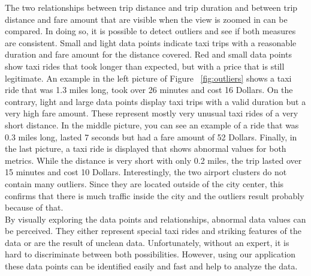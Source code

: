 \documentclass[sigconf, authorversion, nonacm=true]{acmart}
\begin{document}
The two relationships between trip distance and trip duration and between trip distance and fare amount that are visible when the view is zoomed in can be compared. In doing so, it is possible to detect outliers and see if both measures are consistent. Small and light data points indicate taxi trips with a reasonable duration and fare amount for the distance covered. Red and small data points show taxi rides that took longer than expected, but with a price that is still legitimate. An example in the left picture of Figure ~\ref{fig:outliers} shows a taxi ride that was 1.3 miles long, took over 26 minutes and cost 16 Dollars. On the contrary, light and large data points display taxi trips with a valid duration but a very high fare amount. These represent mostly very unusual taxi rides of a very short distance. In the middle picture, you can see an example of a ride that was 0.3 miles long, lasted 7 seconds but had a fare amount of 52 Dollars. Finally, in the last picture, a taxi ride is displayed that shows abnormal values for both metrics. While the distance is very short with only 0.2 miles, the trip lasted over 15 minutes and cost 10 Dollars. Interestingly, the two airport clusters do not contain many outliers. Since they are located outside of the city center, this confirms that there is much traffic inside the city and the outliers result probably because of that.\\
By visually exploring the data points and relationships, abnormal data values can be perceived. They either represent special taxi rides and striking features of the data or are the result of unclean data. Unfortunately, without an expert, it is hard to discriminate between both possibilities. However, using our application these data points can be identified easily and fast and help to analyze the data.
\end{document}

